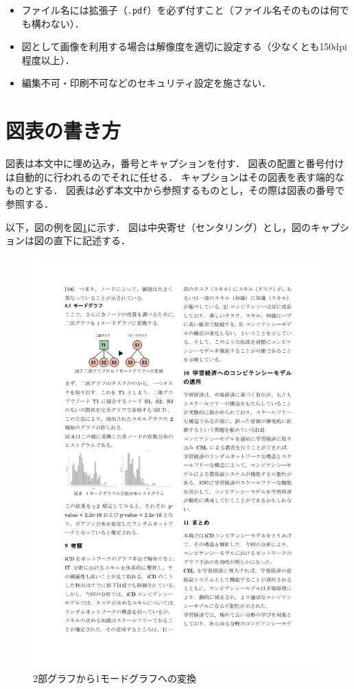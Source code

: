 \documentclass[a4paper,twocolumn,10pt]{ltjsarticle}
\begin{document}
\begin{itemize}
 \item ファイル名には拡張子（{\tt .pdf}）を必ず付すこと（ファイル名そのものは何でも構わない）．
 \item 図として画像を利用する場合は解像度を適切に設定する（少なくとも150dpi程度以上）．
 \item 編集不可・印刷不可などのセキュリティ設定を施さない．
\end{itemize}

\section{図表の書き方}

図表は本文中に埋め込み，番号とキャプションを付す．
図表の配置と番号付けは自動的に行われるのでそれに任せる．
キャプションはその図表を表す端的なものとする．
図表は必ず本文中から参照するものとし，その際は図表の番号で参照する．

以下，図の例を図\ref{fig:graphs}に示す．
図は中央寄せ（センタリング）とし，図のキャプションは図の直下に記述する．

\begin{figure}[htb]
 \begin{center}
  \includegraphics{graphs.pdf}
  \caption{2部グラフから1モードグラフへの変換}
  \label{fig:graphs}
 \end{center}
\end{figure}
\end{document}
